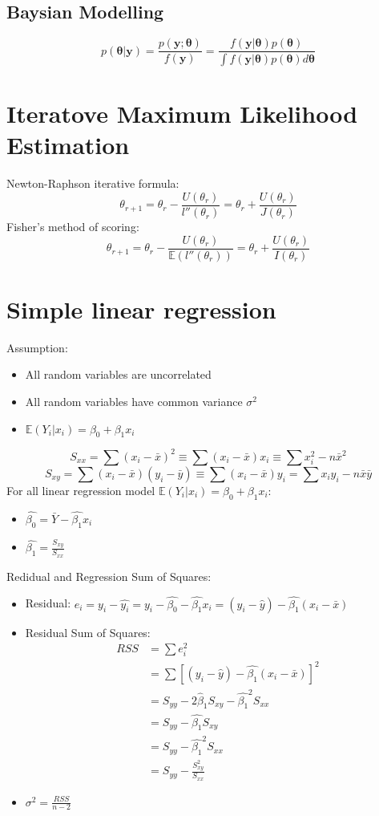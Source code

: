 \documentclass[a4paper]{article}
\begin{document}
	\subsection*{Baysian Modelling}
		$$p(\pmb{\theta}|\mathbf{y}) = \frac{p(\mathbf{y};\pmb{\theta})}{f(\mathbf{y})} = \frac{f(\mathbf{y}|\pmb{\theta})p(\pmb{\theta})}{\int f(\mathbf{y}|\pmb{\theta})p(\pmb{\theta})d\pmb{\theta}}$$

\section*{Iteratove Maximum Likelihood Estimation}
	Newton-Raphson iterative formula: $$\theta_{r+1} = \theta_r - \frac{U(\theta_r)}{l''(\theta_r)} = \theta_r + \frac{U(\theta_r)}{J(\theta_r)}$$
	Fisher's method of scoring: $$\theta_{r+1} = \theta_r - \frac{U(\theta_r)}{\mathbb{E}(l''(\theta_r))} = \theta_r + \frac{U(\theta_r)}{I(\theta_r)}$$

\section*{Simple linear regression}
	Assumption:
	\begin{itemize}
		\item All random variables are uncorrelated
		\item All random variables have common variance $\sigma^2$
		\item $\mathbb{E}(Y_i|x_i) = \beta_0 + \beta_1 x_i$
	\end{itemize}
	$$S_{xx} = \sum(x_i - \bar{x})^2 \equiv \sum(x_i - \bar{x})x_i \equiv \sum x_i^2 - n\bar{x}^2$$
	$$S_{xy} = \sum(x_i - \bar{x})(y_i - \bar{y}) \equiv \sum(x_i - \bar{x})y_i = \sum x_iy_i - n\bar{x}\bar{y}$$
	For all linear regression model $\mathbb{E}(Y_i|x_i) = \beta_0 + \beta_1 x_i$:
	\begin{itemize}
		\item $\hat{\beta_0} = \bar{Y} - \hat{\beta_1} x_i$
		\item $\hat{\beta_1} = \frac{S_{xy}}{S_{xx}}$
	\end{itemize}
	Redidual and Regression Sum of Squares:
		\begin{itemize}
			\item Residual: $e_i = y_i - \hat{y_i} = y_i - \hat{\beta_0} - \hat{\beta_1}x_i = (y_i - \hat{y}) - \hat{\beta_1}(x_i - \bar{x})$
			\item Residual Sum of Squares: \[\begin{split}
				RSS &= \sum e_i^2\\
				&= \sum [(y_i - \hat{y}) - \hat{\beta_1}(x_i - \bar{x})]^2\\
				&= S_{yy} - 2\hat{\beta}_1 S_{xy} - \hat{\beta_1}^2S_{xx}\\
				&= S_{yy} - \hat{\beta_1}S_{xy}\\
				&= S_{yy} - \hat{\beta_1}^2S_{xx}\\
				&= S_{yy} - \frac{S_{xy}^2}{S_{xx}}
			\end{split}\]
			\item $\sigma^2 = \frac{RSS}{n-2}$ 
		\end{itemize}
	\begin{multicols}{2}
	\end{multicols}
\end{document}
